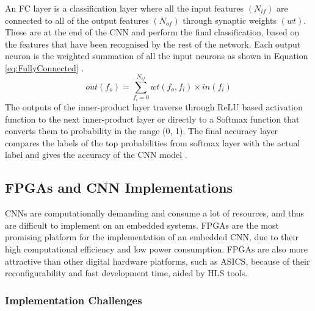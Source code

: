\documentclass[12pt]{article}
\begin{document}
An FC layer is a classification layer where all the input features $(N_{if})$ are connected to all of the output features $(N_{of})$ through synaptic weights $(wt)$. These are at the end of the CNN and perform the final classification, based on the features that have been recognised by the rest of the network. Each output neuron is the weighted summation of all the input neurons as shown in Equation \ref{eq:FullyConnected} \cite{SudaFpgaAccelerator}.
\begin{equation}
out(f_o)=\sum^{N_{if}}_{f_i=0}wt(f_o,f_i)\times in(f_i)
\label{eq:FullyConnected}
\end{equation}
The outputs of the inner-product layer traverse through ReLU based activation function to the next inner-product layer or directly to a Softmax function that converts them to probability in the range (0, 1). The final accuracy layer compares the labels of the top probabilities from softmax layer with the actual label and gives the accuracy of the CNN model \cite{SudaFpgaAccelerator}.

\subsection{FPGAs and CNN Implementations}
\label{sec:Background-FpgaCnnImpl}
\vspace{-12pt}

CNNs are computationally demanding and consume a lot of resources, and thus are difficult to implement on an embedded systems. FPGAs are the most promising platform for the implementation of an embedded CNN, due to their high computational efficiency and low power consumption. FPGAs are also more attractive than other digital hardware platforms, such as ASICS, because of their reconfigurability and fast development time, aided by HLS tools.

\subsubsection{Implementation Challenges}
\label{sec:Background-FpgaCnnImpl-Challenges}
\vspace{-12pt}
\end{document}
